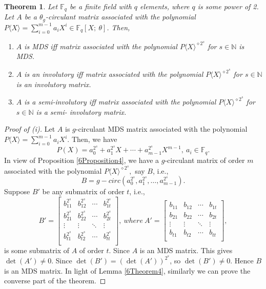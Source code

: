 \documentclass[12pt]{article}
\newtheorem{theorem}{Theorem}
\begin{document}
\begin{theorem}\label{6Theorem 4}
	Let $\mathbb{F}_q$ be a finite field with $q$ elements, where $q$ is some power of 2. Let $A$ be a $\theta_g$-circulant matrix associated with the polynomial $P\langle X \rangle=\sum_{i=0}^{m-1}a_iX^i \in \mathbb{F}_{q}[X;~\theta]$. Then,
	\begin{enumerate}
		\item [(i)] $A$ is  MDS \textup{iff} matrix associated with the polynomial $P\langle X \rangle^{{\diamond} 2^s} $ for $s\in \mathbb{N}$ is MDS.
		\item [(ii)] $A$ is an involutory \textup{iff} matrix associated with the polynomial $P\langle X \rangle^{{\diamond} 2^s} $ for $s\in \mathbb{N}$ is an involutory matrix.
		\item [(iii)]  $A$ is a semi-involutory  \textup{iff} matrix associated with the polynomial $P\langle X \rangle^{{\diamond} 2^s} $ for $s\in \mathbb{N}$ is a semi- involutory matrix.
	\end{enumerate} 
\end{theorem}
	\begin{proof}[Proof of (i)]
	 Let $A$ is $g$-circulant MDS matrix associated with the polynomial $P\langle X \rangle=\sum_{i=0}^{m-1}a_{i}X^{i}.$ Then, we have 
	$$P( X ) =a^{2^s}_{0}+a^{2^s}_{1}X+\cdots+a^{2^s}_{m-1}X^{m-1}, ~a_i\in \mathbb{F}_q.$$
	In view of Proposition \ref{6Proposition4}, we have a $g$-circulant matrix of order $m$ associated with the polynomial $P\langle X \rangle^{{\diamond}2^s}, $ say $B$, i.e.,
	$$B=g-circ(a^{2^s}_0,a^{2^s}_{1},\dots,a^{2^s}_{m-1}).$$
	Suppose $B'$ be any submatrix of order $t$, i.e., 
	$$B'=\begin{bmatrix}
		b^{2^s}_{11}&b^{2^s}_{12}&\cdots&b^{2^s}_{1t}\\
		b^{2^s}_{21}&b^{2^s}_{22}&\cdots&b^{2^s}_{2t}\\
		\vdots&\vdots&\ddots&\vdots\\
		b^{2^s}_{t1}&b^{2^s}_{t2}&\cdots&b^{2^s}_{tt}\\
	\end{bmatrix},~where~A'=\begin{bmatrix}
		b_{11}&b_{12}&\cdots&b_{1t}\\
		b_{21}&b_{22}&\cdots&b_{2t}\\
		\vdots&\vdots&\ddots&\vdots\\
		b_{t1}&b_{t2}&\cdots&b_{tt}\\
	\end{bmatrix},$$
	is some submatrix of $A$ of order $t$. Since $A$ is an MDS matrix. This gives $\det(A')\neq0.$ Since $\det(B')=(\det(A'))^{2^s}$, so $\det(B')\neq 0$. Hence $B$ is an MDS matrix. In light of Lemma \ref{6Theorem4},  similarly we can prove the converse part of the theorem.
	\end{proof}
\end{document}
